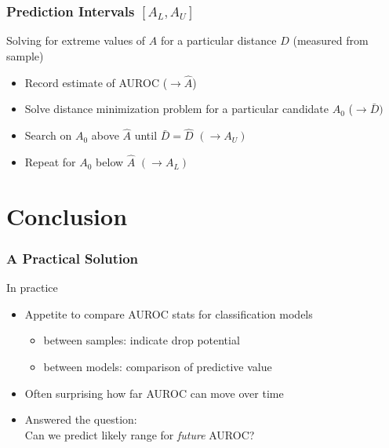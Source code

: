 \documentclass{beamer}
\begin{document}

\begin{frame}
\frametitle{Prediction Intervals $[A_L, A_U]$}

Solving for extreme values of $A$ for a particular distance $\hat{D}$ (measured from sample)
\begin{itemize}
    \item Record estimate of AUROC ($\rightarrow \hat{A}$)
    \item Solve distance minimization problem for a particular candidate $A_0$ ($\rightarrow \bar{D})$
    \item Search on $A_0$ above $\hat{A}$ until $\bar{D} = \hat{D}$ $(\rightarrow A_U)$
    \item Repeat for $A_0$ below $\hat{A}$ $(\rightarrow A_L)$
\end{itemize}

\end{frame}



\section{Conclusion}



\begin{frame}
\frametitle{A Practical Solution}

In practice
\begin{itemize}
    \item Appetite to compare AUROC stats for classification models
    \begin{itemize}
        \item between samples: indicate drop potential
        \item between models: comparison of predictive value
    \end{itemize}
    \item Often surprising how far AUROC can move over time
    \item Answered the question: \\
        Can we predict likely range for \emph{future} AUROC?
\end{itemize}

\end{frame}

\end{document}
